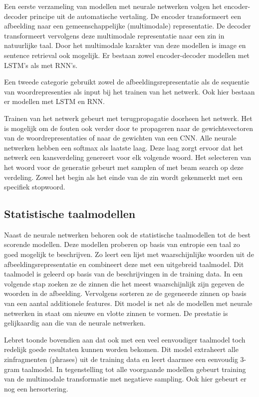 Een eerste verzameling van modellen met neurale netwerken volgen het encoder-decoder principe uit de automatische vertaling.\cite{Kiros} De encoder transformeert een afbeelding naar een gemeenschappelijke (multimodale) representatie. De decoder transformeert vervolgens deze multimodale representatie naar een zin in natuurlijke taal. Door het multimodale karakter van deze modellen is image en sentence retrieval ook mogelijk. Er bestaan zowel encoder-decoder modellen met LSTM's\cite{Kiros} als met RNN's\cite{Karpathy1}\cite{Mao}.

Een tweede categorie gebruikt zowel de afbeeldingsrepresentatie als de sequentie van 
woordrepresenties als input bij het trainen van het netwerk. Ook hier bestaan er modellen met LSTM \cite{Donahue,Vinyals} en RNN\cite{Karpathy}.

Trainen van het netwerk gebeurt met terugpropagatie doorheen het netwerk. Het is mogelijk om de fouten ook verder door te propageren naar de gewichtsvectoren van de woordrepresentaties of naar de gewichten van een CNN.
Alle neurale netwerken hebben een softmax als laatste laag. Deze laag zorgt ervoor dat het netwerk een kansverdeling genereert voor elk volgende woord.
Het selecteren van het woord voor de generatie gebeurt met samplen of met beam search op deze verdeling. Zowel het begin als het einde van de zin wordt gekenmerkt met een specifiek stopwoord.

\subsection{Statistische taalmodellen}
Naast de neurale netwerken behoren ook de statistische taalmodellen tot de best scorende modellen.
Deze modellen proberen op basis van entropie een taal zo goed mogelijk te beschrijven. Zo leert \cite{Fang} een lijst met waarschijnlijke woorden uit de afbeeldingsrepresentatie en combineert deze met een uitgebreid taalmodel. Dit taalmodel is geleerd op basis van de beschrijvingen in de training data. In een volgende stap zoeken ze de zinnen die het meest waarschijnlijk zijn gegeven de woorden in de afbeelding. Vervolgens sorteren ze de gegeneerde zinnen op basis van een aantal additionele features. Dit model is net als de modellen met neurale netwerken in staat om nieuwe en vlotte zinnen te vormen. De prestatie is gelijkaardig aan die van de neurale netwerken.

Lebret \cite{Lebret} toonde bovendien aan dat ook met een veel eenvoudiger taalmodel toch redelijk goede resultaten kunnen worden bekomen. Dit model extraheert alle zinfragmenten (phrases) uit de training data en leert daarmee een eenvoudig 3-gram taalmodel. In tegenstelling tot alle voorgaande modellen gebeurt training van de multimodale transformatie met negatieve sampling. Ook hier gebeurt er nog een hersortering.

